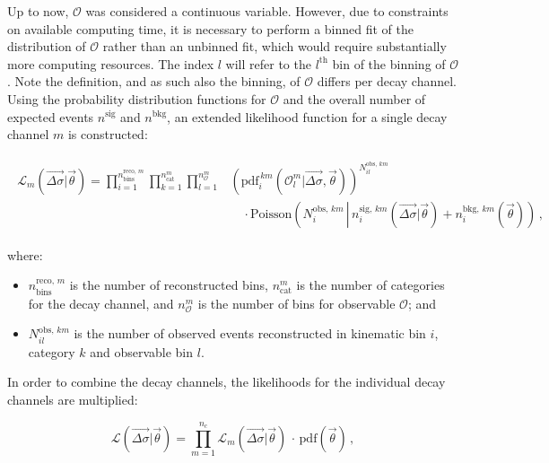 Up to now, $\mathcal{O}$ was considered a continuous variable.
% 
However, due to constraints on available computing time, it is necessary to perform a binned fit of the distribution of $\mathcal{O}$ rather than an unbinned fit, which would require substantially more computing resources.
% 
The index $l$ will refer to the $l^\text{th}$ bin of the binning of $\mathcal{O}$.
% 
Note the definition, and as such also the binning, of $\mathcal{O}$ differs per decay channel.
% 
Using the probability distribution functions for $\mathcal{O}$ and the overall number of expected events $n^\text{sig}$ and $n^\text{bkg}$, an extended likelihood function for a single decay channel $m$ is constructed:
% 
\begin{linenomath*}
\begin{align}
\begin{split}
\mathcal{L}_m(\vec{\Delta\sigma} | \vec{\theta}) =
    \prod_{i=1}^{n_\text{bins}^{\text{reco},\,m}}
    \prod_{k=1}^{n_\text{cat}^m}
    \prod_{l=1}^{n_\mathcal{O}^m}
        &
        \left(
        \text{pdf}_i^{\,km}(\mathcal{O}_l^m | \vec{\Delta\sigma}, \vec{\theta})
        \right)^{ N^{\text{obs},\,km}_{il} }
        \\
        & \quad \cdot
        \text{Poisson}\left(
            N^{\text{obs},\,km}_{i}
            \, \left| \,
            n_i^{\text{sig},\,km}(\vec{\Delta\sigma} | \vec{\theta})
            + n^{\text{bkg},\,km}_i(\vec{\theta})
            \right)\right.
\,,
\label{eq:L_per_decaychannel}
\end{split}
\end{align}
\end{linenomath*}
% 
where:
% 
\begin{itemize}
\item $n_\text{bins}^{\text{reco},\,m}$ is the number of reconstructed bins,
$n_\text{cat}^m$ is the number of categories for the decay channel,
and $n_\mathcal{O}^m$ is the number of bins for observable $\mathcal{O}$; and
% 
\item $N^{\text{obs},\,km}_{il}$ is the number of observed events reconstructed in kinematic bin $i$, category $k$ and observable bin $l$.
\end{itemize}
% 
In order to combine the decay channels, the likelihoods for the individual decay channels are multiplied:
% 
\begin{linenomath*}
\begin{equation}
\label{eq:fulllikelihood}
\mathcal{L}(\vec{\Delta\sigma} | \vec{\theta})
= \prod_{m=1}^{n_c} \mathcal{L}_m(\vec{\Delta\sigma} | \vec{\theta})
    \,\cdot\,
    \text{pdf}(\vec{\theta})
\,,
\end{equation}
\end{linenomath*}
